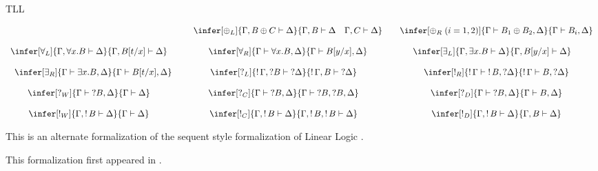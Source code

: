 \begin{entry}{TLL}
\begin{calculus}
\[\begin{array}{cccccccc}
  &&
  \infer[\oplus_L]{\Gamma,B\oplus C \vdash \Delta}{\Gamma,B\vdash \Delta \quad \Gamma,C\vdash \Delta}
  &&
  \infer[\oplus_R\;(i=1,2)]{\Gamma \vdash B_1\oplus B_2, \Delta}{\Gamma \vdash B_i,\Delta}\\
  \\
  \infer[\forall_L]{\Gamma,\forall x.B\vdash \Delta}{\Gamma,B[t/x]\vdash \Delta}\quad
  &&
  \infer[\forall_R]{\Gamma \vdash \forall x.B, \Delta}{\Gamma \vdash B[y/x],\Delta}
  &&
  \infer[\exists_L]{\Gamma,\exists x.B\vdash \Delta}{\Gamma,B[y/x]\vdash \Delta}\quad\\
  \\
  \infer[\exists_R]{\Gamma \vdash \exists x.B, \Delta}{\Gamma \vdash B[t/x],\Delta}
  &&
  \infer[\quest_L]{\bang\Gamma,\quest B\vdash \quest\Delta}{\bang\Gamma,B\vdash \quest\Delta}\quad
  &&
  \infer[\bang_R]{\bang\Gamma\vdash \bang B,\quest\Delta}{\bang\Gamma\vdash B, \quest\Delta}\\
  \\
  \infer[\quest_W]{\Gamma\vdash \quest B,\Delta}{\Gamma\vdash \Delta}\quad
  &&
  \infer[\quest_C]{\Gamma\vdash \quest B,\Delta}{\Gamma\vdash \quest B,\quest B, \Delta}\quad
  &&
  \infer[\quest_D]{\Gamma\vdash \quest B,\Delta}{\Gamma\vdash B, \Delta}\\
  \\
  \infer[\bang_W]{\Gamma,\bang B\vdash \Delta}{\Gamma\vdash \Delta}\quad
  &&
  \infer[\bang_C]{\Gamma,\bang B\vdash \Delta}{\Gamma,\bang B,\bang B\vdash \Delta}\quad
  &&
  \infer[\bang_D]{\Gamma,\bang B\vdash \Delta}{\Gamma, B\vdash \Delta}
\end{array}
\]
\end{calculus}


\begin{clarifications}
This is an alternate formalization of the sequent style formalization
of Linear Logic .
\end{clarifications}

\begin{history}
This formalization first appeared in \cite{Troelstra:1992}.
\end{history}



\end{entry}
